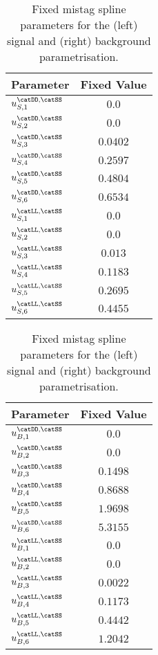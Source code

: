 \begin{table}[h]
\caption{Fixed \SSpi mistag spline parameters for the (left) signal and (right)
background parametrisation.}
\label{tab:app:measurement_of_sin2beta:cpv_measurement:fixed_parameters:eta:ss}
\centering
\begin{tabular}[t]{lr@{$\,\pm\,$}l}
  \toprule
  Parameter                      & \multicolumn{2}{c}{Fixed Value} \\
  \midrule
  $u_{S,1}^\text{\catDD,\catSS}$ & \multicolumn{2}{c}{$0.0$}\\
  $u_{S,2}^\text{\catDD,\catSS}$ & \multicolumn{2}{c}{$0.0$}\\
  $u_{S,3}^\text{\catDD,\catSS}$ & \multicolumn{2}{c}{$0.0402$}\\
  $u_{S,4}^\text{\catDD,\catSS}$ & \multicolumn{2}{c}{$0.2597$}\\
  $u_{S,5}^\text{\catDD,\catSS}$ & \multicolumn{2}{c}{$0.4804$}\\
  $u_{S,6}^\text{\catDD,\catSS}$ & \multicolumn{2}{c}{$0.6534$}\\
  $u_{S,1}^\text{\catLL,\catSS}$ & \multicolumn{2}{c}{$0.0$}\\
  $u_{S,2}^\text{\catLL,\catSS}$ & \multicolumn{2}{c}{$0.0$}\\
  $u_{S,3}^\text{\catLL,\catSS}$ & \multicolumn{2}{c}{$0.013$}\\
  $u_{S,4}^\text{\catLL,\catSS}$ & \multicolumn{2}{c}{$0.1183$}\\
  $u_{S,5}^\text{\catLL,\catSS}$ & \multicolumn{2}{c}{$0.2695$}\\
  $u_{S,6}^\text{\catLL,\catSS}$ & \multicolumn{2}{c}{$0.4455$}\\
  \bottomrule
\end{tabular}
%
\qquad
%
\begin{tabular}[t]{lr@{$\,\pm\,$}l}
  \toprule
  Parameter                     & \multicolumn{2}{c}{Fixed Value} \\
  \midrule
  $u_{B,1}^\text{\catDD,\catSS}$ & \multicolumn{2}{c}{$0.0$}\\
  $u_{B,2}^\text{\catDD,\catSS}$ & \multicolumn{2}{c}{$0.0$}\\
  $u_{B,3}^\text{\catDD,\catSS}$ & \multicolumn{2}{c}{$0.1498$}\\
  $u_{B,4}^\text{\catDD,\catSS}$ & \multicolumn{2}{c}{$0.8688$}\\
  $u_{B,5}^\text{\catDD,\catSS}$ & \multicolumn{2}{c}{$1.9698$}\\
  $u_{B,6}^\text{\catDD,\catSS}$ & \multicolumn{2}{c}{$5.3155$}\\
  $u_{B,1}^\text{\catLL,\catSS}$ & \multicolumn{2}{c}{$0.0$}\\
  $u_{B,2}^\text{\catLL,\catSS}$ & \multicolumn{2}{c}{$0.0$}\\
  $u_{B,3}^\text{\catLL,\catSS}$ & \multicolumn{2}{c}{$0.0022$}\\
  $u_{B,4}^\text{\catLL,\catSS}$ & \multicolumn{2}{c}{$0.1173$}\\
  $u_{B,5}^\text{\catLL,\catSS}$ & \multicolumn{2}{c}{$0.4442$}\\
  $u_{B,6}^\text{\catLL,\catSS}$ & \multicolumn{2}{c}{$1.2042$}\\
  \bottomrule
\end{tabular}
\end{table}
